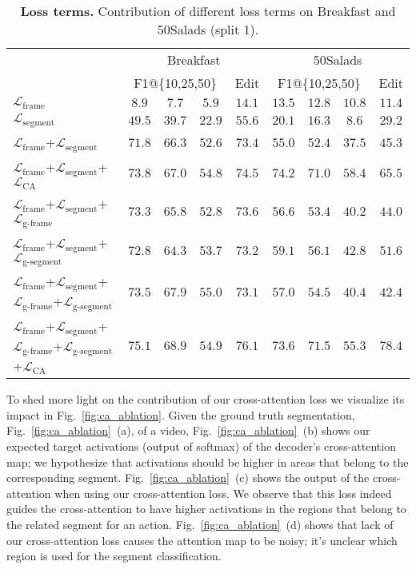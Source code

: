 \begin{table}[h]
\centering
\caption{\textbf{Loss terms.} Contribution of different loss terms on Breakfast and 50Salads (split 1).}
\resizebox{4.0 in}{!} {
\begin{tabular}{l||ccc|c||ccc|c}
\hline 
\hline 
\multicolumn{1}{c||}{} & \multicolumn{4}{c||}{Breakfast} & \multicolumn{4}{c}{50Salads}\\
\cline{2-9} 
 & \multicolumn{3}{c|}{F1@\{10,25,50\}} & Edit & \multicolumn{3}{c|}{F1@\{10,25,50\}} & Edit \\
\hline 
$\mathcal{L}_{\text{frame}}$ & $8.9$ & $7.7$ & $5.9$ & $14.1$ & $13.5$ & $12.8$ & $10.8$ & $11.4$\\
$\mathcal{L}_{\text{segment}}$ & $49.5$ & $39.7$ & $22.9$ & $55.6$ & $20.1$ & $16.3$ & $8.6$ & $29.2$\\
$\mathcal{L}_{\text{frame}}$+$\mathcal{L}_{\text{segment}}$ & $71.8$ & $66.3$ & $52.6$ & $73.4$ & $55.0$ & $52.4$ & $37.5$ & $45.3$\\
$\mathcal{L}_{\text{frame}}$+$\mathcal{L}_{\text{segment}}$+$\mathcal{L}_{\text{CA}}$ & $73.8$ & $67.0$ & $54.8$ & $74.5$ & $74.2$ & $71.0$ & $58.4$ & $65.5$\\
$\mathcal{L}_{\text{frame}}$+$\mathcal{L}_{\text{segment}}$+$\mathcal{L}_{\text{g-frame}}$ & $73.3$ & $65.8$ & $52.8$ & $73.6$ & $56.6$ & $53.4$ & $40.2$ & $44.0$\\
$\mathcal{L}_{\text{frame}}$+$\mathcal{L}_{\text{segment}}$+$\mathcal{L}_{\text{g-segment}}$ & $72.8$ & $64.3$ & $53.7$ & $73.2$ & $59.1$ & $56.1$ & $42.8$ & $51.6$\\
$\mathcal{L}_{\text{frame}}$+$\mathcal{L}_{\text{segment}}$+$\mathcal{L}_{\text{g-frame}}$+$\mathcal{L}_{\text{g-segment}}$ & $73.5$ & $67.9$ & $55.0$ & $73.1$ & $57.0$ & $54.5$ & $40.4$ & $42.4$\\
$\mathcal{L}_{\text{frame}}$+$\mathcal{L}_{\text{segment}}$+$\mathcal{L}_{\text{g-frame}}$+$\mathcal{L}_{\text{g-segment}}$+$\mathcal{L}_{\text{CA}}$ & $75.1$ & $68.9$ & $54.9$ & $76.1$ & $73.6$ & $71.5$ & $55.3$ & $78.4$\\
\hline 
\hline 
\end{tabular}
\label{tab:ablation_losses}
}
\end{table}


To shed more light on the contribution of our cross-attention loss we visualize its impact in Fig.~\ref{fig:ca_ablation}.  
Given the ground truth segmentation, Fig.~\ref{fig:ca_ablation}~(a), of a video, Fig.~\ref{fig:ca_ablation}~(b) shows our expected target activations (output of softmax) of the decoder's cross-attention map; we hypothesize that activations should be higher in areas that belong to the corresponding segment.
Fig.~\ref{fig:ca_ablation}~(c) shows the output of the cross-attention when using our cross-attention loss. 
We observe that this loss indeed guides the cross-attention to have higher activations in the regions that belong to the related segment for an action.
Fig.~\ref{fig:ca_ablation}~(d) shows that lack of our cross-attention loss causes the attention map to be noisy; it's unclear which region is used for the segment classification. 



